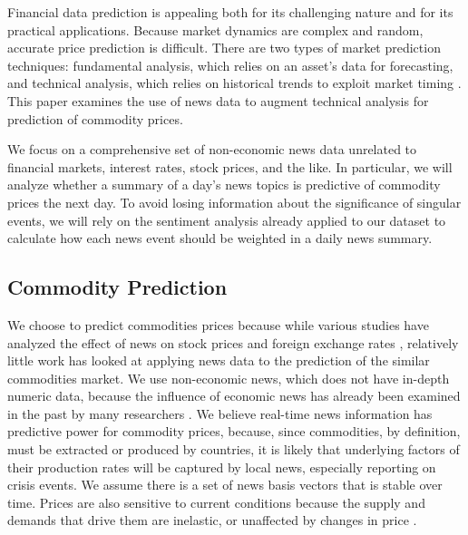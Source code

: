 Financial data prediction is appealing both for its challenging nature and for its practical applications. Because market dynamics are complex and random, accurate price prediction is difficult. There are two types of market prediction techniques: fundamental analysis, which relies on an asset's data for forecasting, and technical analysis, which relies on historical trends to exploit market timing \cite{schumaker2009textual}. This paper examines the use of news data to augment technical analysis for prediction of commodity prices.

We focus on a comprehensive set of non-economic news data unrelated to financial markets, interest rates, stock prices, and the like. In particular, we will analyze whether a summary of a day's news topics is predictive of commodity prices the next day. To avoid losing information about the significance of singular events, we will rely on the sentiment analysis already applied to our dataset to calculate how each news event should be weighted in a daily news summary.

\subsection{Commodity Prediction}
We choose to predict commodities prices because while various studies have analyzed the effect of news on stock prices \cite{mcqueen1993stock} and foreign exchange rates \cite{kamruzzaman2003svm}, relatively little work has looked at applying news data to the prediction of the similar commodities market. We use non-economic news, which does not have in-depth numeric data, because the influence of economic news has already been examined in the past by many researchers \cite{gidofalvi2001using}\cite{schumaker2009textual}\cite{bollen2011twitter}\cite{hagenau2012automated}. We believe real-time news information has predictive power for commodity prices, because, since commodities, by definition, must be extracted or produced by countries, it is likely that underlying factors of their production rates will be captured by local news, especially reporting on crisis events. We assume there is a set of news basis vectors that is stable over time. %
Prices are also sensitive to current conditions because the supply and demands that drive them are inelastic, or unaffected by changes in price \cite{chen2008can}. 

